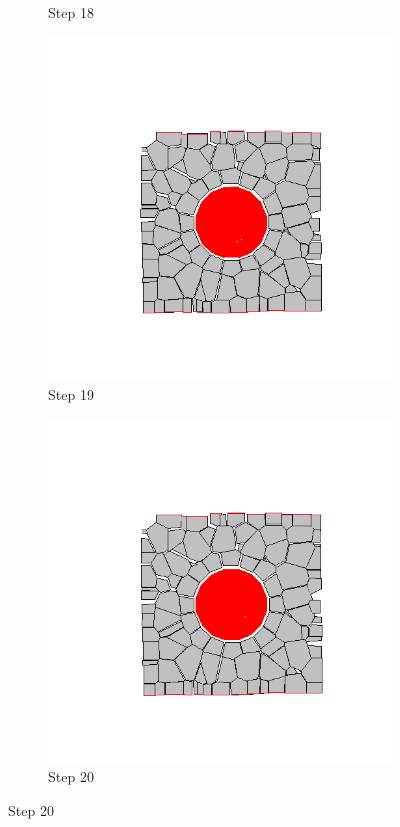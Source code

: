 \begin{figure}[ht!]
\begin{subfigure}{.25\textwidth}
      \caption{Step 18}
      \end{subfigure}%
      \begin{subfigure}{.25\textwidth}
        \centering
        \includegraphics[width=1.0\linewidth]{Files/Small_ASR/CR/DEP5-STEP(019).png}
      \caption{Step 19}
      \end{subfigure}%
      \begin{subfigure}{.25\textwidth}
        \centering
        \includegraphics[width=1.0\linewidth]{Files/Small_ASR/CR/DEP5-STEP(020).png}
      \caption{Step 20}
      \end{subfigure}


\end{figure}
